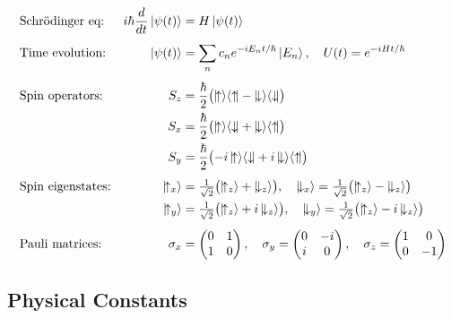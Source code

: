 \begin{align*}
&\text{Schr\"{o}dinger eq:} & i\hbar\frac{d}{dt}\ket{\psi(t)} &= H\ket{\psi(t)} \\[4pt]
&\text{Time evolution:} & \ket{\psi(t)} &= \sum_n c_n e^{-iE_n t/\hbar}\ket{E_n}, \quad U(t) = e^{-iHt/\hbar} \\[4pt]
&\text{Spin operators:} & S_z &= \frac{\hbar}{2}\bigl(\ketbra{\!\uparrow}{\uparrow\!} - \ketbra{\!\downarrow}{\downarrow\!}\bigr) \\
& & S_x &= \frac{\hbar}{2}\bigl(\ketbra{\!\uparrow}{\downarrow\!} + \ketbra{\!\downarrow}{\uparrow\!}\bigr) \\
& & S_y &= \frac{\hbar}{2}\bigl(-i\ketbra{\!\uparrow}{\downarrow\!} + i\ketbra{\!\downarrow}{\uparrow\!}\bigr) \\[4pt]
&\text{Spin eigenstates:} & \ket{\!\uparrow_x} &= \tfrac{1}{\sqrt{2}}\bigl(\ket{\!\uparrow_z} + \ket{\!\downarrow_z}\bigr), \quad \ket{\!\downarrow_x} = \tfrac{1}{\sqrt{2}}\bigl(\ket{\!\uparrow_z} - \ket{\!\downarrow_z}\bigr) \\
& & \ket{\!\uparrow_y} &= \tfrac{1}{\sqrt{2}}\bigl(\ket{\!\uparrow_z} + i\ket{\!\downarrow_z}\bigr), \quad \ket{\!\downarrow_y} = \tfrac{1}{\sqrt{2}}\bigl(\ket{\!\uparrow_z} - i\ket{\!\downarrow_z}\bigr) \\[4pt]
&\text{Pauli matrices:} & \sigma_x &= \begin{pmatrix}0&1\\1&0\end{pmatrix}, \quad \sigma_y = \begin{pmatrix}0&-i\\i&0\end{pmatrix}, \quad \sigma_z = \begin{pmatrix}1&0\\0&-1\end{pmatrix}
\end{align*}

\subsection*{Physical Constants}

